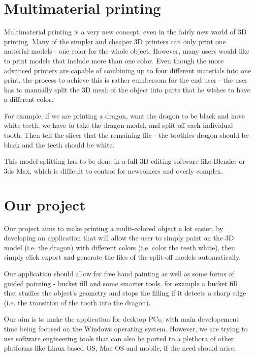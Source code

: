 \section{Multimaterial printing}

Multimaterial printing is a very new concept, even in the fairly new world of 3D printing. Many of the simpler and cheaper 3D printers can only print one material models - one color for the whole object. However, many users would like to print models that include more than one color. Even though the more advanced printers are capable of combining up to four different materials into one print, the process to achieve this is rather cumbersom for the end user - the user has to manually split the 3D mesh of the object into parts that he wishes to have a different color.

For example, if we are printing a dragon, want the dragon to be black and have white teeth, we have to take the dragon model, and split off each individual tooth. Then tell the slicer that the remaining file - the toothles dragon should be black and the teeth should be white.

This model splitting has to be done in a full 3D editing software like Blender or 3ds Max, which is difficult to control for newcomers and overly complex.

\section{Our project}

Our project aims to make printing a multi-colored object a lot easier, by developing an application that will allow the user to simply paint on the 3D model (i.e. the dragon) with different colors (i.e. color the teeth white), then simply click export and generate the files of the split-off models automatically.

Our application should allow for free hand painting as well as some forms of guided painting - bucket fill and some smarter tools, for example a bucket fill that studies the object's geometry and stops the filling if it detects a sharp edge (i.e. the transition of the tooth into the dragon).

Our aim is to make the application for desktop PCs, with main developement time being focused on the Windows operating system. However, we are trying to use software engineering tools that can also be ported to a plethora of other platforms like Linux based OS, Mac OS and mobile, if the need should arise.


